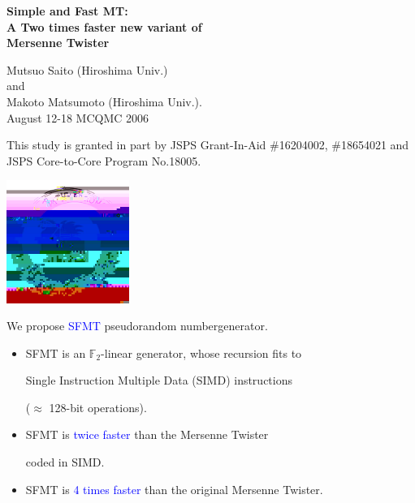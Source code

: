 \documentclass[a4j,12pt,landscape]{jarticle}
\title{}
\author{}
\date{\today}
\def\F2{{\mathbb F}_2}
\begin{document}
\Huge

\begin{center}
{\bf Simple and Fast MT:\\
  A Two times faster new variant of \\
  Mersenne Twister}
\vspace{1cm}

Mutsuo Saito (Hiroshima Univ.) \\
and \\
Makoto Matsumoto (Hiroshima Univ.).\\
August 12-18 MCQMC 2006
\end{center}
\vspace{\fill}
\parbox{19cm}{\Large
This study is granted in part by
JSPS Grant-In-Aid \#16204002, \#18654021
and JSPS Core-to-Core Program No.18005.
}
\parbox{2cm}{\vskip 1cm \includegraphics*[width=4cm,height=4cm]{logo.jpg}}

\newpage
We propose \textcolor{blue}{SFMT} pseudorandom numbergenerator.

\begin{itemize}
\item 
SFMT is an $\F2$-linear generator,
whose recursion fits to 

Single Instruction Multiple Data (SIMD)
instructions 

($\approx$ 128-bit operations).

\item
SFMT is \textcolor{blue}{twice faster} than the Mersenne Twister

coded in SIMD.

\item
SFMT is \textcolor{blue}{4 times faster} than the original Mersenne Twister.

\end{itemize}

\end{document}
